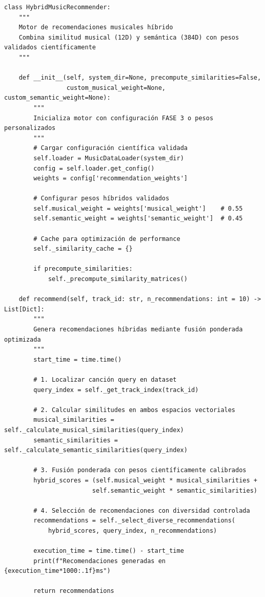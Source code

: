 \documentclass[12pt,a4paper]{report}
\begin{document}
\begin{lstlisting}[caption={Arquitectura Principal del Sistema Híbrido}]
class HybridMusicRecommender:
    """
    Motor de recomendaciones musicales híbrido
    Combina similitud musical (12D) y semántica (384D) con pesos validados científicamente
    """

    def __init__(self, system_dir=None, precompute_similarities=False,
                 custom_musical_weight=None, custom_semantic_weight=None):
        """
        Inicializa motor con configuración FASE 3 o pesos personalizados
        """
        # Cargar configuración científica validada
        self.loader = MusicDataLoader(system_dir)
        config = self.loader.get_config()
        weights = config['recommendation_weights']

        # Configurar pesos híbridos validados
        self.musical_weight = weights['musical_weight']    # 0.55
        self.semantic_weight = weights['semantic_weight']  # 0.45

        # Cache para optimización de performance
        self._similarity_cache = {}

        if precompute_similarities:
            self._precompute_similarity_matrices()

    def recommend(self, track_id: str, n_recommendations: int = 10) -> List[Dict]:
        """
        Genera recomendaciones híbridas mediante fusión ponderada optimizada
        """
        start_time = time.time()

        # 1. Localizar canción query en dataset
        query_index = self._get_track_index(track_id)

        # 2. Calcular similitudes en ambos espacios vectoriales
        musical_similarities = self._calculate_musical_similarities(query_index)
        semantic_similarities = self._calculate_semantic_similarities(query_index)

        # 3. Fusión ponderada con pesos científicamente calibrados
        hybrid_scores = (self.musical_weight * musical_similarities +
                        self.semantic_weight * semantic_similarities)

        # 4. Selección de recomendaciones con diversidad controlada
        recommendations = self._select_diverse_recommendations(
            hybrid_scores, query_index, n_recommendations)

        execution_time = time.time() - start_time
        print(f"Recomendaciones generadas en {execution_time*1000:.1f}ms")

        return recommendations
\end{lstlisting}
\end{document}
